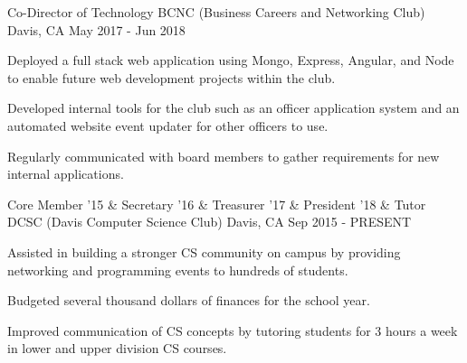 

\begin{cventries}


  \cventry
  {Co-Director of Technology} %
  {BCNC (Business Careers and Networking Club)} %
  {Davis, CA} %
  {May 2017 - Jun 2018} %
  {
    \begin{cvitems} %
      \item {Deployed a full stack web application using Mongo, Express, Angular, and Node to enable future web development projects within the club.}
      \item {Developed internal tools for the club such as an officer application system and an automated website event updater for other officers to use.}
      \item {Regularly communicated with board members to gather requirements for new internal applications.}
    \end{cvitems}
  }
  \cventry
    {Core Member '15
    \& Secretary '16
    \& Treasurer '17
    \& President '18
    \& Tutor} %
    {DCSC (Davis Computer Science Club)} %
    {Davis, CA} %
    {Sep 2015 - PRESENT} %
    {
      \begin{cvitems} %
        \item {Assisted in building a stronger CS community on campus by providing networking and programming events to hundreds of students.}
        \item {Budgeted several thousand dollars of finances for the school year.}
        \item {Improved communication of CS concepts by tutoring students for 3 hours a week in lower and upper division CS courses.}
      \end{cvitems}
    }

\end{cventries}
